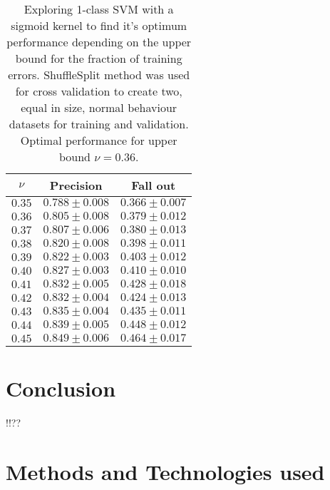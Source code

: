 \documentclass[reqno,openany,12pt]{amsbook}
\begin{document}
\begin{table}
\begin{tabular}{|c|c|c|}
\hline
$\nu$ &  Precision & Fall out \\ \hline 
$0.35$ &  $0.788 \pm 0.008$ & $0.366 \pm 0.007$ \\ \hline 
$0.36$ &  $0.805 \pm 0.008$ & $0.379 \pm 0.012$ \\ \hline 
$0.37$ &  $0.807 \pm 0.006$ & $0.380 \pm 0.013$ \\ \hline 
$0.38$ &  $0.820 \pm 0.008$ & $0.398 \pm 0.011$ \\ \hline 
$0.39$ &  $0.822 \pm 0.003$ & $0.403 \pm 0.012$ \\ \hline 
$0.40$ &  $0.827 \pm 0.003$ & $0.410 \pm 0.010$ \\ \hline 
$0.41$ &  $0.832 \pm 0.005$ & $0.428 \pm 0.018$ \\ \hline 
$0.42$ &  $0.832 \pm 0.004$ & $0.424 \pm 0.013$ \\ \hline 
$0.43$ &  $0.835 \pm 0.004$ & $0.435 \pm 0.011$ \\ \hline
$0.44$ &  $0.839 \pm 0.005$ & $0.448 \pm 0.012$ \\ \hline
$0.45$ &  $0.849 \pm 0.006$ & $0.464 \pm 0.017$ \\ \hline
\end{tabular}
\vspace{5pt}
\caption[Finding optimum 1-class SVM performance depending on bound for training errors]{Exploring 1-class SVM with a sigmoid kernel to find it's optimum performance depending on the upper bound for the fraction of training errors. ShuffleSplit method was used for cross validation to create two, equal in size, normal behaviour datasets for training and validation. Optimal performance for upper bound $\nu = 0.36$.}
\label{1csvmt4}
\end{table}


%

\chapter{Conclusion}


 !!?? 
 
 
\appendix 

\chapter{Methods and Technologies used}
\end{document}
